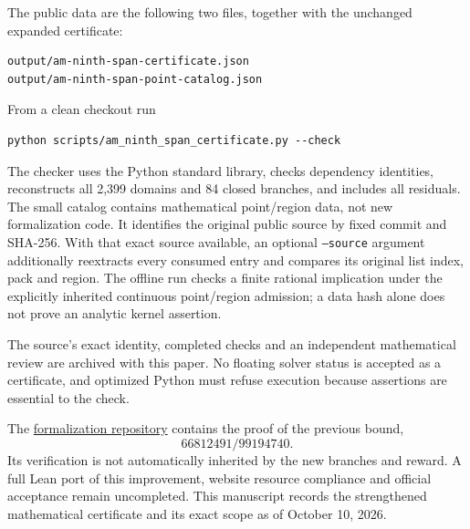 \documentclass[11pt,a4paper]{article}
\begin{document}
The public data are the following two files, together with the
unchanged expanded certificate:
\begin{verbatim}
output/am-ninth-span-certificate.json
output/am-ninth-span-point-catalog.json
\end{verbatim}
From a clean checkout run
\begin{verbatim}
python scripts/am_ninth_span_certificate.py --check
\end{verbatim}
The checker uses the Python standard library, checks dependency
identities, reconstructs all 2,399 domains and 84 closed branches,
and includes all residuals. The small catalog contains mathematical
point/region data, not new formalization code. It identifies the
original public source by fixed commit and SHA-256. With that exact
source available, an optional \texttt{--source} argument additionally
reextracts every consumed entry and compares its original list index,
pack and region. The offline run checks a finite rational implication
under the explicitly inherited continuous point/region admission;
a data hash alone does not prove an analytic kernel assertion.

The source's exact identity, completed checks and an independent
mathematical review are archived with this paper. No floating solver
status is accepted as a certificate, and optimized Python must refuse
execution because assertions are essential to the check.

The
\href{https://github.com/lixiang90/RH-Zero-Proportion-Formalization}
{formalization repository} contains the proof of the previous bound,
\[
 66812491/99194740.
\]
Its verification is not automatically
inherited by the new branches and reward. A full Lean port of this
improvement, website resource compliance and official acceptance
remain uncompleted. This manuscript records the strengthened
mathematical certificate and its exact scope as of October 10, 2026.
\end{document}
